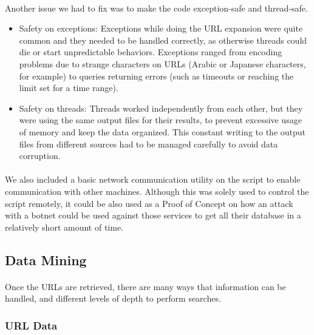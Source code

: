 \documentclass[12pt]{article}
\begin{document}
\paragraph{}
Another issue we had to fix was to make the code exception-safe and thread-safe.

\begin{itemize}

\item  Safety on exceptions: Exceptions while doing the URL expansion were quite common and they needed to be handled correctly, as otherwise threads could die or start unpredictable behaviors. Exceptions ranged from encoding problems due to strange characters on URLs (Arabic or Japanese characters, for example) to queries returning errors (such as timeouts or reaching the limit set for a time range).

\item  Safety on threads: Threads worked independently from each other, but they were using the same output files for their results, to prevent excessive usage of memory and keep the data organized. This constant writing to the output files from different sources had to be managed carefully to avoid data corruption.

\end{itemize}

\paragraph{}
We also included a basic network communication utility on the script to enable communication with other machines. Although this was solely used to control the script remotely, it could be also used as a Proof of Concept on how an attack with a botnet could be used against those services to get all their database in a relatively short amount of time.

\subsection{Data Mining}

\paragraph{}
Once the URLs are retrieved, there are many ways that information can be handled, and different levels of depth to perform searches.

\subsubsection{URL Data}
\end{document}
